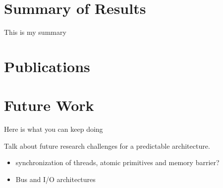 \section{Summary of Results}

This is my summary

\section{Publications}

\section{Future Work}

Here is what you can keep doing

Talk about future research challenges for a predictable architecture.
\begin{itemize}
  \item synchronization of threads, atomic primitives and memory barrier?
  \item Bus and I/O architectures
\end{itemize}
